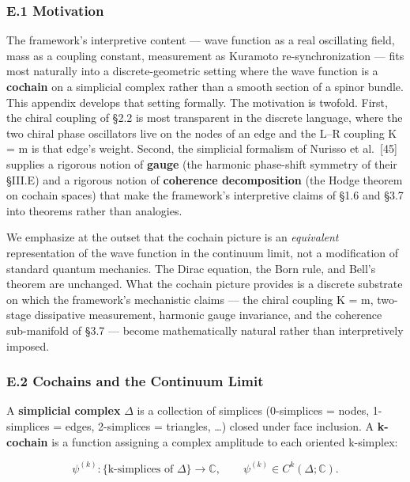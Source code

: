 \documentclass[
]{article}
\begin{document}
\subsubsection{E.1 Motivation}\label{e.1-motivation}

The framework's interpretive content --- wave function as a real
oscillating field, mass as a coupling constant, measurement as Kuramoto
re-synchronization --- fits most naturally into a discrete-geometric
setting where the wave function is a \textbf{cochain} on a simplicial
complex rather than a smooth section of a spinor bundle. This appendix
develops that setting formally. The motivation is twofold. First, the
chiral coupling of §2.2 is most transparent in the discrete language,
where the two chiral phase oscillators live on the nodes of an edge and
the L--R coupling K = m is that edge's weight. Second, the simplicial
formalism of Nurisso et al.~{[}45{]} supplies a rigorous notion of
\textbf{gauge} (the harmonic phase-shift symmetry of their §III.E) and a
rigorous notion of \textbf{coherence decomposition} (the Hodge theorem
on cochain spaces) that make the framework's interpretive claims of §1.6
and §3.7 into theorems rather than analogies.

We emphasize at the outset that the cochain picture is an
\emph{equivalent} representation of the wave function in the continuum
limit, not a modification of standard quantum mechanics. The Dirac
equation, the Born rule, and Bell's theorem are unchanged. What the
cochain picture provides is a discrete substrate on which the
framework's mechanistic claims --- the chiral coupling K = m, two-stage
dissipative measurement, harmonic gauge invariance, and the coherence
sub-manifold of §3.7 --- become mathematically natural rather than
interpretively imposed.

\subsubsection{E.2 Cochains and the Continuum
Limit}\label{e.2-cochains-and-the-continuum-limit}

A \textbf{simplicial complex} \(\Delta\) is a collection of simplices
(0-simplices = nodes, 1-simplices = edges, 2-simplices = triangles,
\ldots) closed under face inclusion. A \textbf{k-cochain} is a function
assigning a complex amplitude to each oriented k-simplex:

\[\psi^{(k)} : \{\text{k-simplices of } \Delta\} \to \mathbb{C}, \qquad
\psi^{(k)} \in C^k(\Delta; \mathbb{C}).\]
\end{document}
